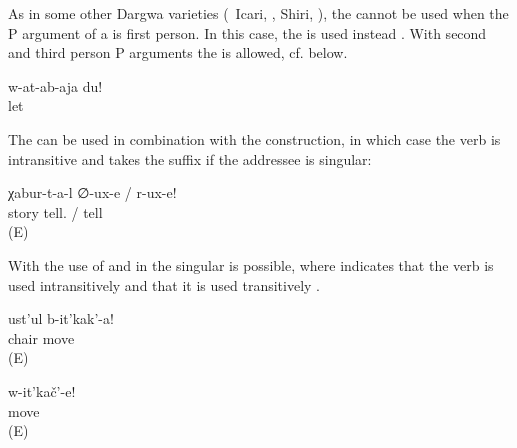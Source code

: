 As in some other Dargwa varieties (\teg\ Icari, \citealp[98]{Sumbatova.Mutalov2003}, Shiri, \citealp{BelyaevInPreparation}), the  cannot be used when the P argument of a  is first person. In this case, the  is used instead . With second and third person P arguments the  is allowed, cf.  below.

\begin{exe}
	\ex	\label{ex:Leave me}
	\gll	w-at-ab-aja	du!\\
		let	\\
	\glt	{}
\end{exe}

The  can be used in combination with the  construction, in which case the verb is intransitive and takes the suffix  if the addressee is singular: 

\begin{exe}
	\ex	\label{ex:Tell stories}
	\gll	χabur-t-a-l	∅-ux-e	/	r-ux-e!\\
		story	tell.	/	tell\\
	\glt	{} (E)
\end{exe}

With  the use of  and  in the  singular is possible, where  indicates that the verb is used intransitively and  that it is used transitively .

\begin{exe}

		\ex	\label{ex:Move the chair}
		\gll	ust'ul	b-it'kak'-a!\\
			chair	move\\
		\glt	{} (E)
	
		\ex	\label{ex:Move (yourself)}
		\gll	w-it'kač'-e!\\
			move\\
		\glt	{} (E)

\end{exe}


